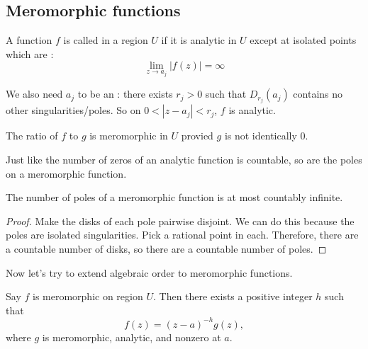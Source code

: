 \subsection{Meromorphic functions}

\begin{definition}
    A function $f$ is called  in a region
    $U$ if it is analytic in $U$ except at isolated points
    which are :
    \[ \lim_{z \to a_j} |f(z)| = \infty 
        \tag{for $a_j$ running over a countable index set $I$}
    \]

    We also need $a_j$ to be an :
    there exists $r_j>0$ such that $D_{r_j}(a_j)$
    contains no other singularities/poles.
    So on $0 < |z-a_j| < r_j$, $f$ is analytic.

\end{definition}

\begin{exercise}
    The ratio of $f$ to $g$ is meromorphic in $U$ provied
    $g$ is not identically $0$.
\end{exercise}

Just like the number of zeros of an analytic function is countable,
so are the poles on a meromorphic function.

\begin{theorem}
    The number of poles of a meromorphic function
    is at most countably infinite.
\end{theorem}

\begin{proof}
    Make the disks of each pole pairwise disjoint.
    We can do this because the poles are isolated singularities.
    Pick a rational point in each.
    Therefore, there are a countable number of disks,
    so there are a countable number of poles.
\end{proof}

Now let's try to extend algebraic order to meromorphic 
functions.

\begin{theorem}
    Say $f$ is meromorphic on region $U$.
    Then there exists a positive integer $h$ such that
    \[ f(z) = (z-a)^{-h} g(z), \]
    where $g$ is meromorphic, analytic, and nonzero at $a$.
\end{theorem}

